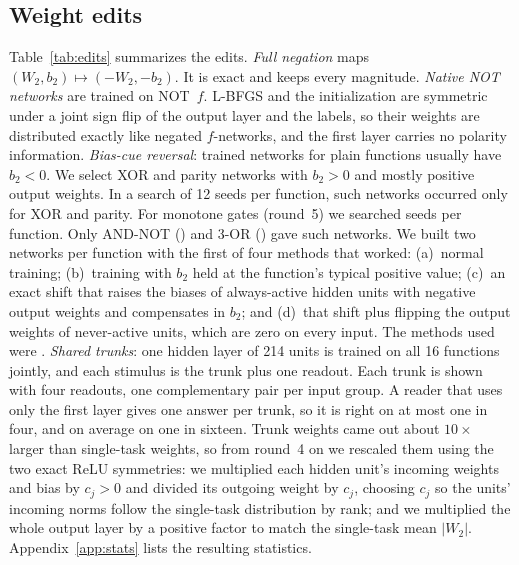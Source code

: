 \documentclass[10pt]{article}
\begin{document}
\subsection{Weight edits}
\label{sec:edits}
Table~\ref{tab:edits} summarizes the edits. \emph{Full negation} maps $(W_2,b_2)\mapsto(-W_2,-b_2)$. It is exact and keeps every magnitude. \emph{Native NOT networks} are trained on NOT~$f$. L-BFGS and the initialization are symmetric under a joint sign flip of the output layer and the labels, so their weights are distributed exactly like negated $f$-networks, and the first layer carries no polarity information.
\emph{Bias-cue reversal}: trained networks for plain functions usually have $b_2<0$. We select XOR and parity networks with $b_2>0$ and mostly positive output weights. In a search of 12 seeds per function, such networks occurred only for XOR and parity. For monotone gates (round~5) we searched \nRFiveSearchN{} seeds per function. Only AND-NOT (\nRFiveHitsD) and 3-OR (\nRFiveHitsK) gave such networks. We built two networks per function with the first of four methods that worked: (a)~normal training; (b)~training with $b_2$ held at the function's typical positive value; (c)~an exact shift that raises the biases of always-active hidden units with negative output weights and compensates in $b_2$; and (d)~that shift plus flipping the output weights of never-active units, which are zero on every input. The methods used were \nRFiveMethods.
\emph{Shared trunks}: one hidden layer of 214 units is trained on all 16 functions jointly, and each stimulus is the trunk plus one readout. Each trunk is shown with four readouts, one complementary pair per input group. A reader that uses only the first layer gives one answer per trunk, so it is right on at most one in four, and on average on one in sixteen.
Trunk weights came out about $10\times$ larger than single-task weights, so from round~4 on we rescaled them using the two exact ReLU symmetries: we multiplied each hidden unit's incoming weights and bias by $c_j>0$ and divided its outgoing weight by $c_j$, choosing $c_j$ so the units' incoming norms follow the single-task distribution by rank; and we multiplied the whole output layer by a positive factor to match the single-task mean $|W_2|$. Appendix~\ref{app:stats} lists the resulting statistics.
\end{document}
